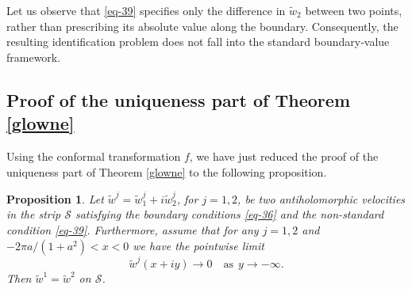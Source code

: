 \documentclass[11pt, letterpaper, reqno]{amsart}
\numberwithin{equation}{section}
\theoremstyle{definition}
\theoremstyle{plain}
\newtheorem{prop}[defi]{Proposition}
\numberwithin{equation}{section}
\def\SS{\mathcal{S}}
\begin{document}
Let us observe that \eqref{eq-39} specifies only the difference in $\tilde{w}_2$ between two points, rather than prescribing its absolute value along the boundary. Consequently, the resulting identification problem does not fall into the standard boundary‐value framework.

\subsection{Proof of the uniqueness part of Theorem \ref{glowne}}
Using the conformal transformation $f$, we have just reduced the proof of the uniqueness part of Theorem \ref{glowne} to the following proposition.
\begin{prop}\label{tresc}
Let $\tilde{w}^j = \tilde{w}^{j}_{1}+i\tilde{w}^{j}_{2}$, for $j = 1, 2$, be two antiholomorphic velocities in the strip $\SS$ satisfying the boundary conditions \eqref{eq-36} and the non-standard condition \eqref{eq-39}. Furthermore, assume that for any $j=1,2$ and $-2\pi a/(1+a^2)<x<0$ we have the pointwise limit
\begin{equation}\label{obietnica}
\tilde{w}^j(x+iy)\rightarrow 0\quad \text{as} \ \ y\to -\infty.
\end{equation}
Then $\tilde{w}^1 = \tilde{w}^2$ on $\SS$.
\end{prop}
\end{document}
